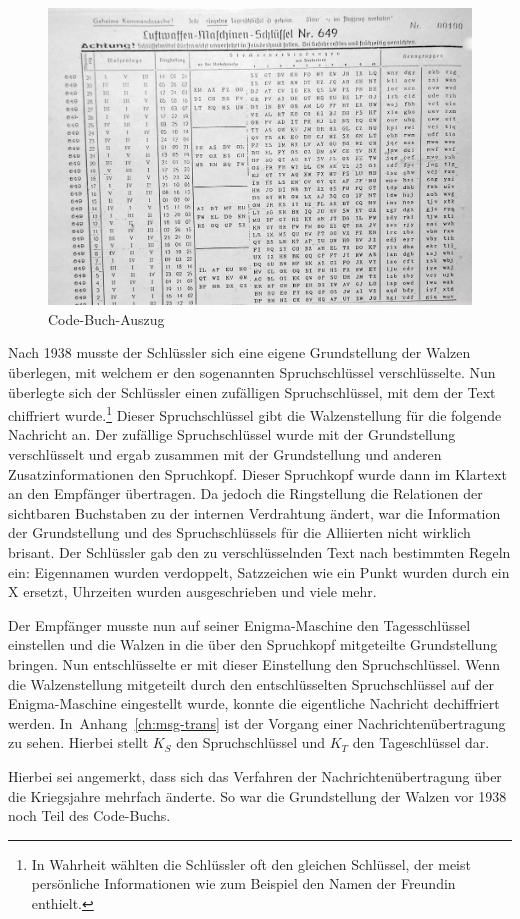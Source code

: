 \begin{figure}[htbp]
	\centering
	\includegraphics[width=.6\linewidth]{Enigma/Enigma-code-book}
	\caption{Code-Buch-Auszug\autocite{wiki:enigmacodebook}}
	\label{fig:enigma_code_book}
\end{figure}

\newpage

Nach 1938 musste der Schlüssler sich eine eigene Grundstellung der Walzen überlegen, mit welchem er den sogenannten Spruchschlüssel verschlüsselte.
Nun überlegte sich der Schlüssler einen \glqq zufälligen\grqq{} Spruchschlüssel, mit dem der Text chiffriert wurde.\footnote{In Wahrheit wählten die Schlüssler oft den gleichen Schlüssel, der meist persönliche Informationen wie zum Beispiel den Namen der Freundin enthielt.}
Dieser Spruchschlüssel gibt die Walzenstellung für die folgende Nachricht an.
Der \glqq zufällige\grqq{} Spruchschlüssel wurde mit der Grundstellung verschlüsselt und ergab zusammen mit der Grundstellung und anderen Zusatzinformationen den \glqq Spruchkopf\grqq.
Dieser Spruchkopf wurde dann im Klartext an den Empfänger übertragen.  
Da jedoch die Ringstellung die Relationen der sichtbaren Buchstaben zu der internen Verdrahtung ändert, war die Information der Grundstellung und des Spruchschlüssels für die Alliierten nicht wirklich brisant.
Der Schlüssler gab den zu verschlüsselnden Text nach bestimmten Regeln ein\autocite{schluesselm1940}: Eigennamen wurden verdoppelt, Satzzeichen wie ein Punkt wurden durch ein X ersetzt, Uhrzeiten wurden ausgeschrieben und viele mehr.

Der Empfänger musste nun auf seiner Enigma-Maschine den Tagesschlüssel einstellen und die Walzen in die über den Spruchkopf mitgeteilte Grundstellung bringen.
Nun entschlüsselte er mit dieser Einstellung den Spruchschlüssel.
Wenn die Walzenstellung mitgeteilt durch den entschlüsselten Spruchschlüssel auf der Enigma-Maschine eingestellt wurde, konnte die eigentliche Nachricht dechiffriert werden.
In~Anhang~\ref{ch:msg-trans} ist der Vorgang einer Nachrichtenübertragung zu sehen.
Hierbei stellt $K_S$ den Spruchschlüssel und $K_T$ den Tageschlüssel dar.

Hierbei sei angemerkt, dass sich das Verfahren der Nachrichtenübertragung über die Kriegsjahre mehrfach änderte.
So war die Grundstellung der Walzen vor 1938 noch Teil des Code-Buchs.


